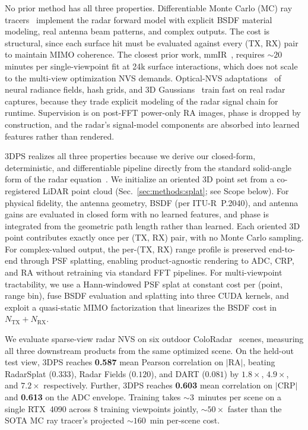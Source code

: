 No prior method has all three properties. Differentiable Monte Carlo (MC) ray tracers~\cite{sionna, hofmann2025inverse, chen2025invertwin, mmIR2026} implement the radar forward model with explicit BSDF material modeling, real antenna beam patterns, and complex outputs. The cost is structural, since each surface hit must be evaluated against every (TX, RX) pair to maintain MIMO coherence. The closest prior work, mmIR~\cite{mmIR2026}, requires ${\sim}20$ minutes per single-viewpoint fit at 24k surface interactions, which does not scale to the multi-view optimization NVS demands. Optical-NVS adaptations~\cite{huang2024dart, 10.1145/3641519.3657510, takawale2025spinr, kung2025radarsplat} of neural radiance fields, hash grids, and 3D Gaussians~\cite{mildenhall2021nerf, 3dgs} train fast on real radar captures, because they trade explicit modeling of the radar signal chain for runtime. Supervision is on post-FFT power-only RA images, phase is dropped by construction, and the radar's signal-model components are absorbed into learned features rather than rendered.

3DPS realizes all three properties because we derive our closed-form, deterministic, and differentiable pipeline directly from the standard solid-angle form of the radar equation~\cite{skolnik2001introduction, mmIR2026}. We initialize an oriented 3D point set from a co-registered LiDAR point cloud (Sec.~\ref{sec:methods:splat}; see Scope below). For physical fidelity, the antenna geometry, BSDF (per ITU-R~P.2040), and antenna gains are evaluated in closed form with no learned features, and phase is integrated from the geometric path length rather than learned. Each oriented 3D point contributes exactly once per (TX, RX) pair, with no Monte Carlo sampling. For complex-valued output, the per-(TX, RX) range profile is preserved end-to-end through PSF splatting, enabling product-agnostic rendering to ADC, CRP, and RA without retraining via standard FFT pipelines. For multi-viewpoint tractability, we use a Hann-windowed PSF splat at constant cost per (point, range bin), fuse BSDF evaluation and splatting into three CUDA kernels, and exploit a quasi-static MIMO factorization that linearizes the BSDF cost in $N_{\text{TX}} + N_{\text{RX}}$.

We evaluate sparse-view radar NVS on six outdoor ColoRadar~\cite{kramer2022coloradar} scenes, measuring all three downstream products from the same optimized scene. On the held-out test view, 3DPS reaches \textbf{0.587} mean Pearson correlation on $|\mathrm{RA}|$, beating RadarSplat ($0.333$), Radar Fields ($0.120$), and DART ($0.081$) by $1.8\times$, $4.9\times$, and $7.2\times$ respectively. Further, 3DPS reaches \textbf{0.603} mean correlation on $|\mathrm{CRP}|$ and \textbf{0.613} on the ADC envelope. Training takes ${\sim}3$~minutes per scene on a single RTX~4090 across 8 training viewpoints jointly, ${\sim}50\times$ faster than the SOTA MC ray tracer's projected ${\sim}160$~min per-scene cost.

